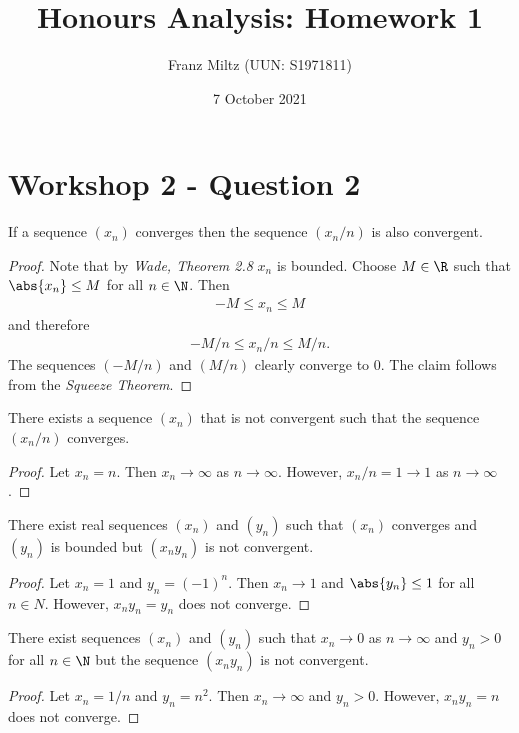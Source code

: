 \documentclass{article}
\begin{document}
\title{Honours Analysis: Homework 1}
\author{Franz Miltz (UUN: S1971811)}
\date{7 October 2021}
\maketitle

\section{Workshop 2 - Question 2}

\begin{claim}
   If a sequence $(x_n)$ converges then the sequence $(x_n/n)$ is also convergent.
\end{claim}
\begin{proof}
   Note that by \emph{Wade, Theorem 2.8} $x_n$ is bounded. Choose $M\in\R$ such that
   $\abs{x_n}\leq M$ for all $n\in\N$. Then
   \begin{align*}
      -M \leq x_n \leq M
   \end{align*}
   and therefore
   \begin{align*}
      -M/n \leq x_n / n \leq M/n.
   \end{align*}
   The sequences $(-M/n)$ and $(M/n)$ clearly converge to $0$. The claim follows from the
   \emph{Squeeze Theorem}.
\end{proof}

\begin{claim}
   There exists a sequence $(x_n)$ that is not convergent such that the sequence $(x_n/n)$ converges.
\end{claim}
\begin{proof}
   Let $x_n=n$. Then $x_n\to\infty$ as $n\to\infty$. However,
   $x_n/n=1 \to 1$ as $n\to\infty$.
\end{proof}

\begin{claim}
   There exist real sequences $(x_n)$ and $(y_n)$ such that $(x_n)$ converges and $(y_n)$
   is bounded but $(x_ny_n)$ is not convergent.
\end{claim}
\begin{proof}
   Let $x_n=1$ and $y_n=(-1)^n$. Then $x_n\to 1$ and $\abs{y_n}\leq 1$ for all $n\in N$.
   However, $x_ny_n=y_n$ does not converge.
\end{proof}

\begin{claim}
   There exist sequences $(x_n)$ and $(y_n)$ such that $x_n\to 0$ as $n\to\infty$ and $y_n>0$
   for all $n\in\N$ but the sequence $(x_ny_n)$ is not convergent.
\end{claim}
\begin{proof}
   Let $x_n=1/n$ and $y_n=n^2$. Then $x_n\to\infty$ and $y_n>0$. However,
   $x_ny_n=n$ does not converge.
\end{proof}
\end{document}
